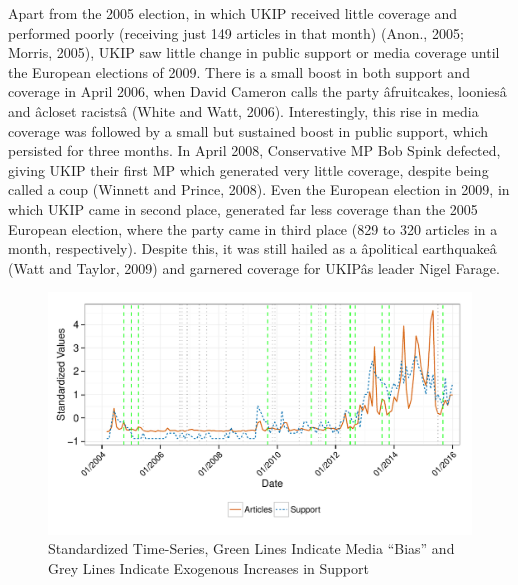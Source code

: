 \documentclass[12pt,article]{article}
\begin{document}
Apart from the 2005 election, in which UKIP received little coverage and
performed poorly (receiving just 149 articles in that month) (Anon.,
2005; Morris, 2005), UKIP saw little change in public support or media
coverage until the European elections of 2009. There is a small boost in
both support and coverage in April 2006, when David Cameron calls the
party âfruitcakes, looniesâ and âcloset racistsâ (White and
Watt, 2006). Interestingly, this rise in media coverage was followed by
a small but sustained boost in public support, which persisted for three
months. In April 2008, Conservative MP Bob Spink defected, giving UKIP
their first MP which generated very little coverage, despite being
called a coup (Winnett and Prince, 2008). Even the European election in
2009, in which UKIP came in second place, generated far less coverage
than the 2005 European election, where the party came in third place
(829 to 320 articles in a month, respectively). Despite this, it was
still hailed as a âpolitical earthquakeâ (Watt and Taylor, 2009) and
garnered coverage for UKIPâs leader Nigel Farage.

\begin{figure}[htbp]
\centering
\includegraphics{ukip_media_files/figure-latex/unnamed-chunk-9-1.pdf}
\caption{Standardized Time-Series, Green Lines Indicate Media ``Bias''
and Grey Lines Indicate Exogenous Increases in Support}
\end{figure}
\end{document}
